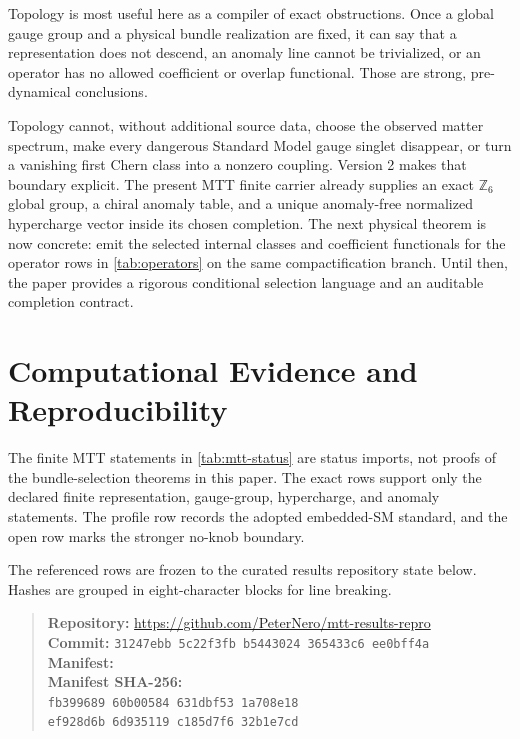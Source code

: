 \documentclass[11pt]{article}
\newcommand{\Z}{\mathbb{Z}}
\begin{document}
Topology is most useful here as a compiler of exact obstructions. Once a
global gauge group and a physical bundle realization are fixed, it can say
that a representation does not descend, an anomaly line cannot be
trivialized, or an operator has no allowed coefficient or overlap
functional. Those are strong, pre-dynamical conclusions.

Topology cannot, without additional source data, choose the observed matter
spectrum, make every dangerous Standard Model gauge singlet disappear, or
turn a vanishing first Chern class into a nonzero coupling. Version 2 makes
that boundary explicit. The present MTT finite carrier already supplies an
exact \(\Z_6\) global group, a chiral anomaly table, and a unique
anomaly-free normalized hypercharge vector inside its chosen completion.
The next physical theorem is now concrete: emit the selected internal
classes and coefficient functionals for the operator rows in
\cref{tab:operators} on the same compactification branch. Until then, the
paper provides a rigorous conditional selection language and an auditable
completion contract.

\section*{Computational Evidence and Reproducibility}
The finite MTT statements in \cref{tab:mtt-status} are status imports, not
proofs of the bundle-selection theorems in this paper. The exact rows support
only the declared finite representation, gauge-group, hypercharge, and
anomaly statements. The profile row records the adopted embedded-SM standard,
and the open row marks the stronger no-knob boundary.

The referenced rows are frozen to the curated results repository state below.
Hashes are grouped in eight-character blocks for line breaking.
\begin{quote}\small
\textbf{Repository:}
\url{https://github.com/PeterNero/mtt-results-repro}\\
\textbf{Commit:}
\texttt{31247ebb 5c22f3fb b5443024 365433c6 ee0bff4a}\\
\textbf{Manifest:} \\
\textbf{Manifest SHA-256:}\\
\texttt{fb399689 60b00584 631dbf53 1a708e18}\\
\texttt{ef928d6b 6d935119 c185d7f6 32b1e7cd}
\end{quote}
\end{document}

